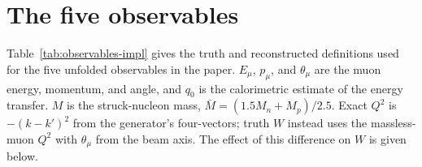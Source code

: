 \section{The five observables}
\label{supp:observables}

\label{sec:eavailw-definitions}
\providecommand{\pcell}[2]{\parbox[t]{#1}{\raggedright\strut#2\strut}}
Table~\ref{tab:observables-impl} gives the truth and reconstructed definitions used for the five unfolded observables in the paper. $E_{\mu}$, $p_{\mu}$, and $\theta_{\mu}$ are the muon energy, momentum, and angle, and $q_{0}$ is the calorimetric estimate of the energy transfer. $M$ is the struck-nucleon mass, $\bar M=(1.5M_{n}+M_{p})/2.5$.  Exact $Q^{2}$ is $-(k-k')^{2}$ from the generator's four-vectors; truth $W$ instead uses the massless-muon $Q^{2}$ with $\theta_{\mu}$ from the beam axis. The effect of this difference on $W$ is given below.

